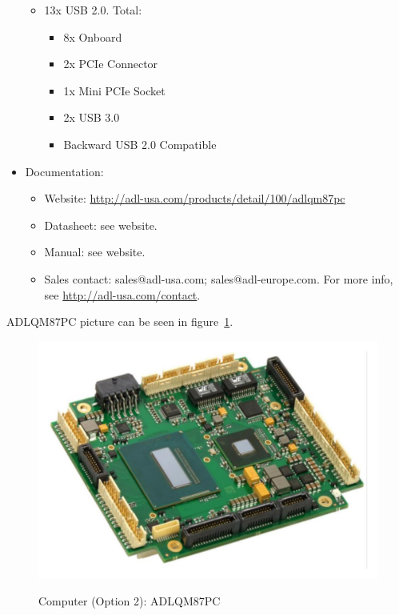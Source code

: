 \begin{itemize}
\begin{itemize}
    \item 13x USB 2.0. Total:
    \begin{itemize}
      \item 8x Onboard
      \item 2x PCIe Connector
      \item 1x Mini PCIe Socket
      \item 2x USB 3.0
      \item Backward USB 2.0 Compatible
    \end{itemize}
  \end{itemize}
  \item Documentation:
  \begin{itemize}
    \item Website: \href{http://adl-usa.com/products/detail/100/adlqm87pc}{http://adl-usa.com/products/detail/100/adlqm87pc}
    \item Datasheet: see website.
    \item Manual: see website.
    \item Sales contact: sales@adl-usa.com; sales@adl-europe.com. For more info, see \href{http://adl-usa.com/contact}{http://adl-usa.com/contact}.
  \end{itemize}
\end{itemize}
ADLQM87PC picture can be seen in figure~\ref{FIG:DEVICEPCOPTION2}.
\begin{figure}
  \centering
  \includegraphics[angle=90,width=1\columnwidth]{figs/body02/FIGDEVICEPCOPTION2.pdf}\\
  \caption[Computer (Option 2): ADLQM87PC]{Computer (Option 2): ADLQM87PC}
  \label{FIG:DEVICEPCOPTION2}
\end{figure}

